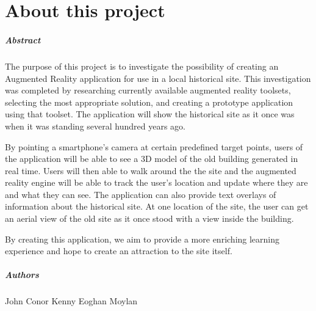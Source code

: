 
\graphicspath{ {/Home/Users/TheShockMaster/Desktop} }

\chapter*{About this project}

\paragraph{Abstract}
The purpose of this project is to investigate the possibility of creating an Augmented Reality application for use in a local historical site. This investigation was completed by researching currently available augmented reality toolsets, selecting the most appropriate solution, and creating a prototype application using that toolset. The application will show the historical site as it once was when it was standing several hundred years ago.

By pointing a smartphone’s camera at certain predefined target points, users of the application will be able to see a 3D model of the old building generated in real time. Users will then able to walk around the the site and the augmented reality engine will be able to track the user’s location and update where they are and what they can see. The application can also provide text overlays of information about the historical site. At one location of the site, the user can get an aerial view of the old site as it once stood with a view inside the building. \cite{latexcompanion}

By creating this application, we aim to provide a more enriching learning experience and hope to create an attraction to the site itself. \cite{kantra}
\paragraph{Authors}
John Conor Kenny
Eoghan Moylan

